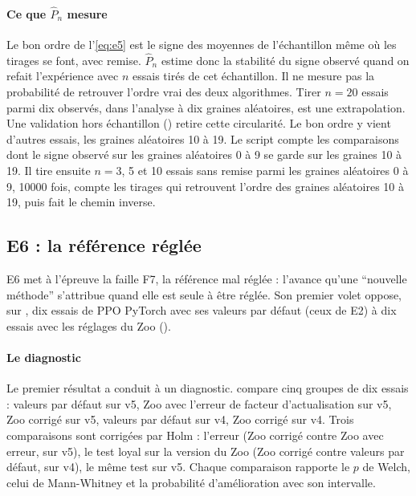 \paragraph{Ce que $\hat P_n$ mesure}
Le bon ordre de l'\cref{eq:e5} est le signe des moyennes de l'échantillon même où les tirages se font, avec
remise. $\hat P_n$ estime donc la stabilité du signe observé quand on refait l'expérience avec $n$ essais tirés
de cet échantillon. Il ne mesure pas la probabilité de retrouver l'ordre vrai des deux algorithmes. Tirer
$n=20$ essais parmi dix observés, dans l'analyse à dix graines aléatoires, est une extrapolation. Une validation hors échantillon
() retire cette circularité. Le bon ordre y vient
d'autres essais, les graines aléatoires 10 à 19. Le script compte les comparaisons dont le signe observé sur les
graines aléatoires 0 à 9 se garde sur les graines 10 à 19. Il tire ensuite $n=3$, 5 et 10 essais sans remise
parmi les graines aléatoires 0 à 9, \num{10000} fois, compte les tirages qui retrouvent l'ordre des graines
aléatoires 10 à 19, puis fait le chemin inverse.

\subsection{E6 : la référence réglée}\label{sec:plan-e6}
E6 met à l'épreuve la faille F7, la référence mal réglée : l'avance qu'une \enquote{nouvelle méthode}
s'attribue quand elle est seule à être réglée. Son premier volet oppose, sur , dix essais de PPO
PyTorch avec ses valeurs par défaut (ceux de E2) à dix essais avec les réglages du Zoo ().

\paragraph{Le diagnostic}
Le premier résultat a conduit à un diagnostic.  compare
cinq groupes de dix essais : valeurs par défaut sur v5, Zoo avec l'erreur de facteur d'actualisation sur v5,
Zoo corrigé sur v5, valeurs par défaut sur v4, Zoo corrigé sur v4. Trois comparaisons sont corrigées par Holm :
l'erreur (Zoo corrigé contre Zoo avec erreur, sur v5), le test loyal sur la version du Zoo (Zoo corrigé contre
valeurs par défaut, sur v4), le même test sur v5. Chaque comparaison rapporte le $p$ de Welch, celui de
Mann-Whitney et la probabilité d'amélioration avec son intervalle.

